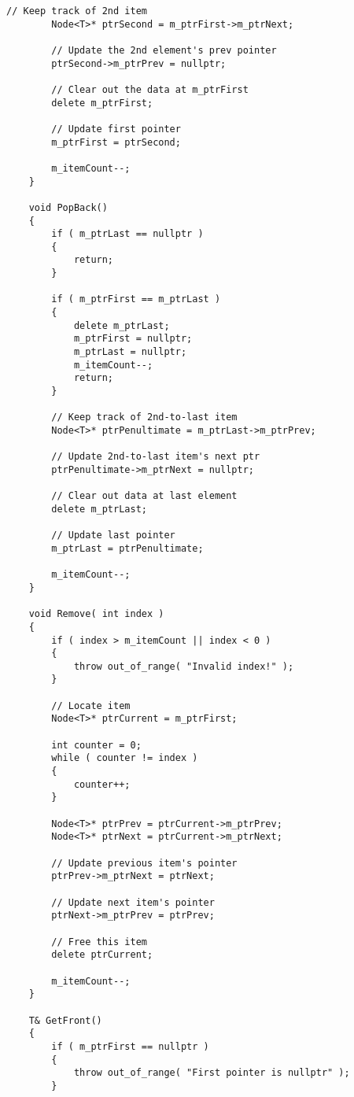\documentclass[a4paper,12pt,oneside]{book}
\begin{document}
\begin{lstlisting}[style=code]
        // Keep track of 2nd item
        Node<T>* ptrSecond = m_ptrFirst->m_ptrNext;

        // Update the 2nd element's prev pointer
        ptrSecond->m_ptrPrev = nullptr;

        // Clear out the data at m_ptrFirst
        delete m_ptrFirst;

        // Update first pointer
        m_ptrFirst = ptrSecond;

        m_itemCount--;
    }

    void PopBack()
    {
        if ( m_ptrLast == nullptr )
        {
            return;
        }

        if ( m_ptrFirst == m_ptrLast )
        {
            delete m_ptrLast;
            m_ptrFirst = nullptr;
            m_ptrLast = nullptr;
            m_itemCount--;
            return;
        }

        // Keep track of 2nd-to-last item
        Node<T>* ptrPenultimate = m_ptrLast->m_ptrPrev;

        // Update 2nd-to-last item's next ptr
        ptrPenultimate->m_ptrNext = nullptr;

        // Clear out data at last element
        delete m_ptrLast;

        // Update last pointer
        m_ptrLast = ptrPenultimate;

        m_itemCount--;
    }

    void Remove( int index )
    {
        if ( index > m_itemCount || index < 0 )
        {
            throw out_of_range( "Invalid index!" );
        }

        // Locate item
        Node<T>* ptrCurrent = m_ptrFirst;

        int counter = 0;
        while ( counter != index )
        {
            counter++;
        }

        Node<T>* ptrPrev = ptrCurrent->m_ptrPrev;
        Node<T>* ptrNext = ptrCurrent->m_ptrNext;

        // Update previous item's pointer
        ptrPrev->m_ptrNext = ptrNext;

        // Update next item's pointer
        ptrNext->m_ptrPrev = ptrPrev;

        // Free this item
        delete ptrCurrent;

        m_itemCount--;
    }

    T& GetFront()
    {
        if ( m_ptrFirst == nullptr )
        {
            throw out_of_range( "First pointer is nullptr" );
        }


\end{lstlisting}
\end{document}
